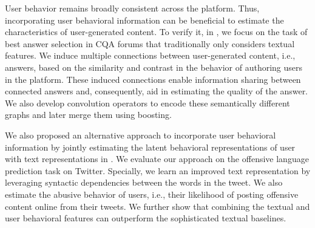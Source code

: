 User behavior remains broadly consistent across the platform. Thus, incorporating user behavioral information can be beneficial to estimate the characteristics of user-generated content.
To verify it, in , we focus on the task of best answer selection in CQA forums that traditionally only considers textual features. We induce multiple connections between user-generated content, i.e., answers, based on the similarity and contrast in the behavior of authoring users in the platform. These induced connections enable information sharing between connected answers and, consequently, aid in estimating the quality of the answer.
We also develop convolution operators to encode these semantically different graphs and later merge them using boosting.

We also proposed an alternative approach to incorporate user behavioral information by jointly estimating the latent behavioral representations of user with text representations in . We evaluate our approach on the offensive language prediction task on Twitter. Specially, we learn an improved text representation by leveraging syntactic dependencies between the words in the tweet. We also estimate the abusive behavior of users, i.e., their likelihood of posting offensive content online from their tweets. We further show that combining the textual and user behavioral features can outperform the sophisticated textual baselines.
